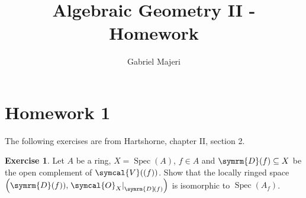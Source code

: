 \documentclass[a4paper, 12pt]{article}
\theoremstyle{definition}
\newtheorem{exercise}{Exercise}
\newcommand*{\Spec}[1]{\operatorname{Spec}\left(#1\right)}
\newcommand*{\distinguished}[1]{\symrm{D}\!\left(#1\right)}
\newcommand*{\vanishingset}[1]{\symcal{V}\!\left(#1\right)}
\newcommand*{\sheaf}{\symcal{O}}
\newif\ifsolutions
\begin{document}
\title{Algebraic Geometry II - Homework}
\author{Gabriel Majeri}
\date{}

\maketitle

\section*{Homework 1}

The following exercises are from Hartshorne, chapter II, section 2.

\begin{exercise}
Let \(A\) be a ring, \(X = \Spec{A}\), \(f \in A\) and \(\distinguished{f} \subseteq X\) be the open complement of \(\vanishingset{(f)}\). Show that the locally ringed space \(\left(\distinguished{f}), \left.\sheaf_{X}\right|_{\distinguished{f}}\right)\) is isomorphic to \(\Spec{A_{f}}\).
\end{exercise}
\ifsolutions
\end{document}
